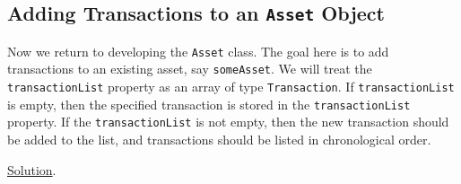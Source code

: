 \subsection{Adding Transactions to an \texttt{Asset} Object} \label{subsect:AddTransaction}

Now we return to developing the \texttt{Asset} class. The goal here is to add transactions to an existing asset, say \texttt{someAsset}. We will treat the \texttt{transactionList} property as an array of type \texttt{Transaction}. If \texttt{transactionList} is empty, then the specified transaction is stored in the \texttt{transactionList} property. If the \texttt{transactionList} is not empty, then the new transaction should be added to the list, and transactions should be listed in chronological order.

\noindent \underline{Solution}.

